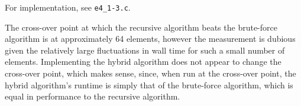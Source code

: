 For implementation, see \texttt{e4\_1-3.c}.

The cross-over point at which the recursive algorithm beats the brute-force algorithm is at approximately 64 elements, however the measurement is dubious given the relatively large fluctuations in wall time for such a small number of elements. Implementing the hybrid algorithm does not appear to change the cross-over point, which makes sense, since, when run at the cross-over point, the hybrid algorithm's runtime is simply that of the brute-force algorithm, which is equal in performance to the recursive algorithm.
